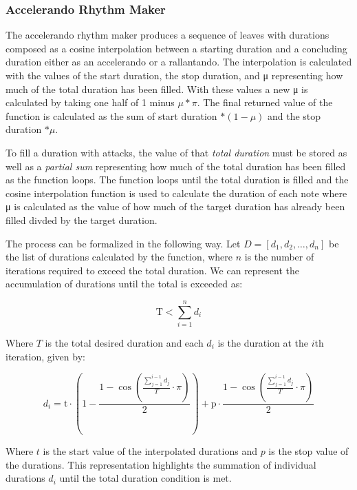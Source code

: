 \subsubsection{Accelerando Rhythm Maker}
The accelerando rhythm maker produces a sequence of leaves with durations composed as a cosine interpolation between a starting duration and a concluding duration either as an accelerando or a rallantando. The interpolation is calculated with the values of the start duration, the stop duration, and μ representing how much of the total duration has been filled. With these values a new μ is calculated by taking one half of 1 minus $μ * π$. The final returned value of the function is calculated as the sum of start duration $* (1 - μ)$ and the stop duration $* μ$.

To fill a duration with attacks, the value of that \textit{total duration} must be stored as well as a \textit{partial sum} representing how much of the total duration has been filled as the function loops. The function loops until the total duration is filled and the cosine interpolation function is used to calculate the duration of each note where μ is calculated as the value of how much of the target duration has already been filled divded by the target duration.

The process can be formalized in the following way. Let \( D = [d_1, d_2, \ldots, d_n] \) be the list of durations calculated by the function, where \( n \) is the number of iterations required to exceed the total duration. We can represent the accumulation of durations until the total is exceeded as:

\begin{equation}
\text{T} < \sum_{i=1}^{n} d_i
\end{equation}

Where $T$ is the total desired duration and each \( d_i \) is the duration at the \( i \)th iteration, given by:

\begin{equation}
d_i = \text{t} \cdot \left(1 - \frac{1 - \cos\left(\frac{\sum_{j=1}^{i-1} d_j}{T} \cdot \pi\right)}{2}\right) + \text{p} \cdot \frac{1 - \cos\left(\frac{\sum_{j=1}^{i-1} d_j}{T} \cdot \pi\right)}{2}
\end{equation}

Where $t$ is the start value of the interpolated durations and $p$ is the stop value of the durations. This representation highlights the summation of individual durations \( d_i \) until the total duration condition is met.

